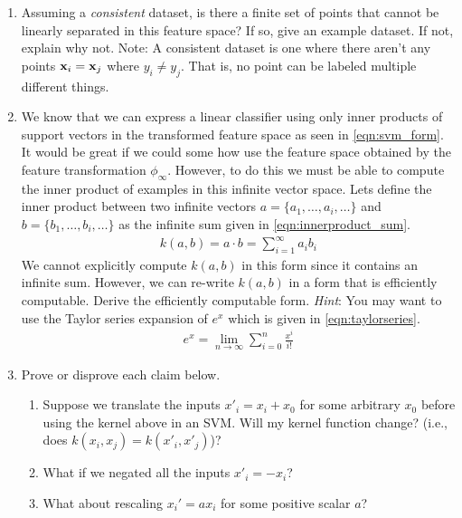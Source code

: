 \begin{enumerate}
  \begin{enumerate}
  \item {} Assuming a \emph{consistent} dataset, is there a
    finite set of points that cannot be linearly separated in this
    feature space?  If so, give an example dataset.  If not, explain
    why not.  Note: A consistent dataset is one where there aren't any
    points $\mathbf{x}_i = \mathbf{x}_j$ where $y_i \ne y_j$.  That is, no point can
    be labeled multiple different things.

  \item {} We know that we can express a linear classifier
    using only inner products of support vectors in the transformed
    feature space as seen in \autoref{eqn:svm_form}.  It would be
    great if we could some how use the feature space obtained by the
    feature transformation $\phi_{\infty}$.  However, to do this we
    must be able to compute the inner product of examples in this
    infinite vector space.  Lets define the inner product between two
    infinite vectors $a=\{a_1,\ldots,a_i,\ldots\}$ and
    $b=\{b_1,\ldots,b_i,\ldots\}$ as the infinite sum given in
    \autoref{eqn:innerproduct_sum}.
    \begin{eqnarray}
      k(a,b) = a \cdot b = \sum_{i=1}^{\infty} a_i b_i
      \label{eqn:innerproduct_sum}
    \end{eqnarray}
    We cannot explicitly compute $k(a,b)$ in this form since it
    contains an infinite sum.  However, we can re-write $k(a,b)$ in a
    form that is efficiently computable.  Derive the efficiently
    computable form.  \emph{Hint}: You may want to use the Taylor
    series expansion of $e^x$ which is given in
    \autoref{eqn:taylorseries}.
    \begin{eqnarray}
      e^{x}=\lim_{n \rightarrow \infty} \sum_{i=0}^n \frac{x^i}{i!}
      \label{eqn:taylorseries}
    \end{eqnarray}

  \item {}  Prove or disprove each claim below.
  
    \begin{enumerate}
    \item Suppose we translate the inputs $x'_i = x_i + x_0$ for some
      arbitrary $x_0$ before using the kernel above in an SVM.  Will my
      kernel function change? (i.e., does $k(x_i,x_j) = k(x'_i,x'_j)$)?
    \item What if we negated all the inputs $x'_i = -x_i$?
    \item What about rescaling $x_i' = ax_i$ for some positive scalar $a$?
      
      
    \end{enumerate}  
  \end{enumerate}
\end{enumerate}
  
\PointStats
